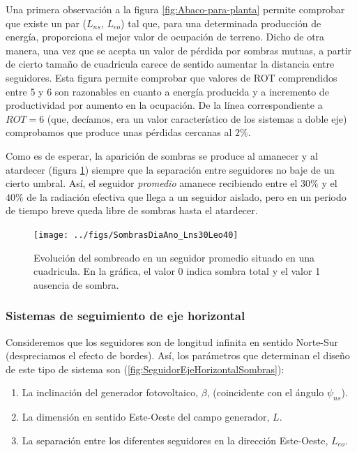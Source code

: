 Una primera observación a la figura \ref{fig:Abaco-para-planta} permite
comprobar que existe un par ($L_{ns}$, $L_{eo}$) tal que, para una
determinada producción de energía, proporciona el mejor valor de ocupación
de terreno. Dicho de otra manera, una vez que se acepta un valor de
pérdida por sombras mutuas, a partir de cierto tamaño de cuadricula
carece de sentido aumentar la distancia entre seguidores. Esta figura
permite comprobar que valores de ROT comprendidos entre 5 y 6 son
razonables en cuanto a energía producida y a incremento de productividad
por aumento en la ocupación. De la línea correspondiente a $ROT=6$
(que, decíamos, era un valor característico de los sistemas a doble
eje) comprobamos que produce unas pérdidas cercanas al $2\%$. 

Como es de esperar, la aparición de sombras se produce al amanecer
y al atardecer (figura \ref{fig:CuadriculaFija}) siempre que la separación
entre seguidores no baje de un cierto umbral. Así, el seguidor \emph{promedio}
amanece recibiendo entre el $30\%$ y el $40\%$ de la radiación efectiva
que llega a un seguidor aislado, pero en un periodo de tiempo breve
queda libre de sombras hasta el atardecer. 

%
\begin{figure}
\begin{centering}
\texttt{[image: ../figs/SombrasDiaAno\_Lns30Leo40]}
\end{centering}

\caption[Evolución del sombreado en un seguidor
promedio]{\label{fig:CuadriculaFija}
Evolución del sombreado en un seguidor
promedio situado en una cuadricula. 
En la gráfica, el valor 0 indica
sombra total y el valor 1 ausencia de sombra.}

\end{figure}

\subsubsection{Sistemas de seguimiento de eje horizontal}

Consideremos que los seguidores son de longitud infinita en sentido
Norte-Sur (despreciamos el efecto de bordes). Así, los parámetros
que determinan el diseño de este tipo de sistema son (\ref{fig:SeguidorEjeHorizontalSombras}):

\begin{enumerate}
\item La inclinación del generador fotovoltaico, $\beta$, (coincidente
con el ángulo $\psi_{ns}$).
\item La dimensión en sentido Este-Oeste del campo generador, $L$.
\item La separación entre los diferentes seguidores en la dirección Este-Oeste,
$L_{eo}$. 
\end{enumerate}


